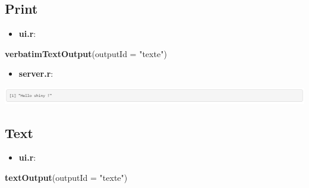 \documentclass[
]{article}
\newenvironment{Shaded}{\begin{snugshade}}{\end{snugshade}}
\newcommand{\AttributeTok}[1]{\textcolor[rgb]{0.13,0.29,0.53}{#1}}
\newcommand{\FunctionTok}[1]{\textcolor[rgb]{0.13,0.29,0.53}{\textbf{#1}}}
\newcommand{\NormalTok}[1]{#1}
\newcommand{\OtherTok}[1]{\textcolor[rgb]{0.56,0.35,0.01}{#1}}
\newcommand{\SpecialCharTok}[1]{\textcolor[rgb]{0.81,0.36,0.00}{\textbf{#1}}}
\newcommand{\StringTok}[1]{\textcolor[rgb]{0.31,0.60,0.02}{#1}}
\providecommand{\tightlist}{%
  \setlength{\itemsep}{0pt}\setlength{\parskip}{0pt}}
\begin{document}
\hypertarget{print}{%
\subsection{Print}\label{print}}

\begin{itemize}
\tightlist
\item
  \textbf{ui.r}:
\end{itemize}

\begin{Shaded}
\begin{Highlighting}[]
\FunctionTok{verbatimTextOutput}\NormalTok{(}\AttributeTok{outputId =} \StringTok{"texte"}\NormalTok{)}
\end{Highlighting}
\end{Shaded}

\begin{itemize}
\tightlist
\item
  \textbf{server.r}:
\end{itemize}

\begin{Shaded}
\end{Shaded}

\includegraphics{img/otext.png}

\hypertarget{text}{%
\subsection{Text}\label{text}}

\begin{itemize}
\tightlist
\item
  \textbf{ui.r}:
\end{itemize}

\begin{Shaded}
\begin{Highlighting}[]
\FunctionTok{textOutput}\NormalTok{(}\AttributeTok{outputId =} \StringTok{"texte"}\NormalTok{)}
\end{Highlighting}
\end{Shaded}
\end{document}
